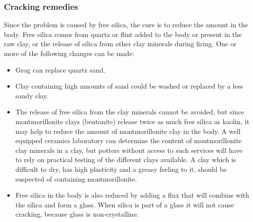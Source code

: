 \subsubsection{Cracking remedies}
Since the problem is caused by free silica, the cure is to reduce the amount in 
the body. Free silica comes from quartz or flint added to the body or 
present in the raw clay, or the release of silica from other clay minerals 
during firing. One or more of the following changes can be made:
\begin{itemize}
\item Grog can replace quartz sand.
\item Clay containing high amounts of sand could be washed or replaced by a 
less sandy clay.
\item The release of free silica from the clay minerals cannot be avoided, but 
since montmorillonite clays (bentonite) release twice as much free silica as 
kaolin, it may help to reduce the amount of montmorillonite clay in the body. A 
well equipped ceramics laboratory can determine the content of montmorillonite 
clay minerals in a clay, but potters without access to such services will have 
to rely on practical testing of the different clays available. A clay which is 
difficult to dry, has high plasticity and a greasy feeling to it, should be 
suspected of containing montmorillonite.
\item Free silica in the body is also reduced by adding a flux that will combine
with the silica and form a glass. When silica is part of a glass it will not 
cause cracking, because glass is non-crystalline.
\end{itemize}
